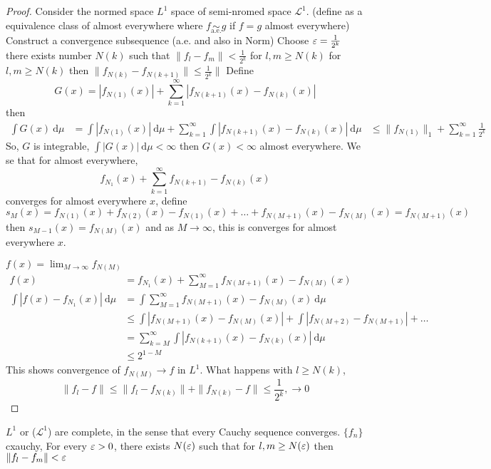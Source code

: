 \begin{proof}
  Consider the normed space $L^1$ space of semi-nromed space $\mathcal{L}^1$. (define as a equivalence class of almost everywhere where $f \underset{\text{a.e.}}\sim g$ if $f = g$ almost everywhere)
  Construct a convergence subsequence (a.e. and also in Norm)
  Choose $\varepsilon = \frac1{2^k}$ there exists number $N(k)$ such that $\|f_l - f_m\| < \frac1{2^k}$ for $l, m \ge N(k)$ for $l, m \ge N(k)$
  then $\|f_{N(k)} - f_{N(k+1)}\| \le \frac1{2^k}\|$
  Define
  \[G(x) = |f_{N(1)}(x)| + \sum_{k=1}^\infty |f_{N(k+1)}(x) - f_{N(k)}(x)|\]
  then 
  \begin{align*}
    \int G(x)\ \mathrm{d}\mu &= \int|f_{N(1)}(x)|\ \mathrm{d}\mu + \sum_{k=1}^\infty \int |f_{N(k+1)}(x) - f_{N(k)}(x)|\ \mathrm{d}\mu
    &\le \|f_{N(1)}\|_1 + \sum_{k=1}^\infty \frac1{2^k} 
  \end{align*}
  So, $G$ is integrable, $\int |G(x)|\ \mathrm{d}\mu < \infty$ then $G(x) < \infty$ almost everywhere.
  We se that for almost everywhere, 
  \[f_{N_1}(x) + \sum_{k=1}^\infty f_{N(k+1)} - f_{N(k)}(x)\]
  converges for almost everywhere $x$, define
  \[s_M(x) = f_{N(1)}(x) + f_{N(2)}(x) - f_{N(1)}(x) + \dotsc + f_{N(M+1)}(x) - f_{N(M)}(x) = f_{N(M+1)}(x)\]
  then $s_{M-1}(x) = f_{N(M)}(x)$ and as $M \to \infty$, this is converges for almost everywhere $x$.

  $f(x) = \lim_{M\to\infty} f_{N(M)}$ 
  \begin{align*}
    f(x) &= f_{N_1}(x) + \sum_{M=1}^\infty f_{N(M+1)}(x) - f_{N(M)}(x) \\
    \int |f(x) - f_{N_1}(x)| \ \mathrm{d}\mu &= \int \sum_{M=1}^\infty f_{N(M+1)}(x) - f_{N(M)}(x) \ \mathrm{d}\mu \\
    &\le \int |f_{N(M+1)}(x) - f_{N(M)}(x)| + \int |f_{N(M+2)} - f_{N(M+1)}| + \dotsc \\
    &= \sum_{k=M}^\infty \int |f_{N(k+1)}(x) - f_{N(k)}(x)| \ \mathrm{d}\mu \\
    &\le 2^{1-M}
  \end{align*}
  This shows convergence of $f_{N(M)} \to f$ in $L^1$.
  What happens with $l \ge N(k)$, 
  \[\|f_l - f\| \le \|f_l - f_{N(k)}\| + \|f_{N(k)} - f\| \le \frac1{2^k}, \to 0\]
\end{proof}


$L^1$ or ($\mathcal{L}^1$) are complete, in the sense that every Cauchy sequence converges.
$\{f_n\}$ cxauchy, For every $\varepsilon > 0$, there exists $N(\varepsilon)$ such that for $l, m \ge N(\varepsilon)$ then $\|f_l - f_m\| < \varepsilon$

